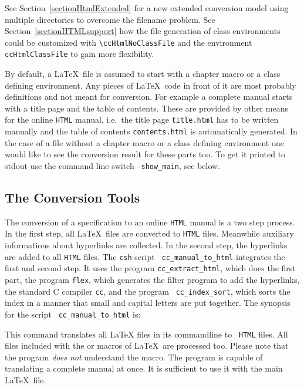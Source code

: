 \documentclass[12pt]{article}
\newcommand{\Dindex}[1]{#1\index{#1}}
\def\ind{\hspace*{7mm}}
\begin{document}
See Section~\ref{sectionHtmlExtended} for a new extended conversion
model using multiple directories to overcome the filename problem.
See Section~\ref{sectionHTMLsupport} how the file generation of class
environments could be customized with \verb+\ccHtmlNoClassFile+ and the
environment {\tt ccHtmlClassFile} to gain more flexibility.

By default, a \LaTeX\ file is assumed to start with a chapter macro or
a class defining environment. Any pieces of \LaTeX\ code in front of
it are most probably definitions and not meant for conversion. For
example a complete manual starts with a title page and the table of
contents. These are provided by other means for the online {\tt HTML}
manual, i.e.\ the title page {\tt title.html} has to be written
manually and the table of contents {\tt contents.html} is
automatically generated.  In the case of a file without a chapter
macro or a class defining environment one would like to see the
conversion result for these parts too. To get it printed to stdout use
the command line switch {\tt -show\_main}, see below.


\subsection{The Conversion Tools}

The conversion of a specification to an online {\tt HTML} manual is a
two step process. In the first step, all \LaTeX\ files are converted
to {\tt HTML} files. Meanwhile auxiliary informations about
\Dindex{hyperlinks} are collected.  In the second step, the hyperlinks
are added to all {\tt HTML} files.  The {\tt csh}-script {\tt
  cc\_manual\_to\_html} integrates the first and second step. It uses
the program {\tt cc\_extract\_html}, which does the first part, the
program {\tt flex}, which generates the filter program to add the
hyperlinks, the standard C compiler {\tt cc}, and the program {\tt
  cc\_index\_sort}, which sorts the index in a manner that small and
capital letters are put together. The synopsis for the script {\tt
  cc\_manual\_to\_html} is:

\ind{\tt cc\_manual\_to\_html [<options>] <tex-files\ldots>}

This command translates all LaTeX files in its commandline to {\tt
  HTML} files. All files included with the \verb++ or
\verb++ macros of \LaTeX\ are processed too. Please note that
the program {\em does not} understand the \verb++ macro.
The program is capable of translating a complete manual at once. It is
sufficient to use it with the main \LaTeX\ file.
\end{document}
